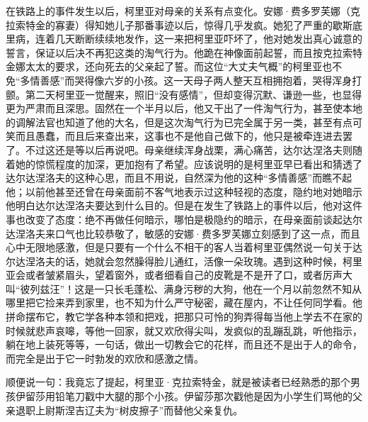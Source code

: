 \par 在铁路上的事件发生以后，柯里亚对母亲的关系有点变化。安娜·费多罗芙娜（克拉索特金的寡妻）得知她儿子那番事迹以后，惊得几乎发疯。她犯了严重的歇斯底里病，连着几天断断续续地发作，这一来把柯里亚吓坏了，他对她发出真心诚意的誓言，保证以后决不再犯这类的淘气行为。他跪在神像面前起誓，而且按克拉索特金娜太太的要求，还向死去的父亲起了誓。而这位“大丈夫气概”的柯里亚也不免“多情善感”而哭得像六岁的小孩。这一天母子两人整天互相拥抱着，哭得浑身打颤。第二天柯里亚一觉醒来，照旧“没有感情”，但却变得沉默、谦逊一些，也显得更为严肃而且深思。固然在一个半月以后，他又干出了一件淘气行为，甚至使本地的调解法官也知道了他的大名，但是这次淘气行为已完全属于另一类，甚至有点可笑而且愚蠢，而且后来查出来，这事也不是他自己做下的，他只是被牵连进去罢了。不过这还是等以后再说吧。母亲继续浑身战栗，满心痛苦，达尔达涅洛夫则随着她的惊慌程度的加深，更加抱有了希望。应该说明的是柯里亚早已看出和猜透了达尔达涅洛夫的这种心思，而且不用说，自然深为他的这种“多情善感”而瞧不起他；以前他甚至还曾在母亲面前不客气地表示过这种轻视的态度，隐约地对她暗示他明白达尔达涅洛夫要达到什么目的。但是在发生了铁路上的事件以后，他对这件事也改变了态度：绝不再做任何暗示，哪怕是极隐约的暗示，在母亲面前谈起达尔达涅洛夫来口气也比较恭敬了，敏感的安娜·费多罗芙娜立刻感到了这一点，而且心中无限地感激，但是只要有一个什么不相干的客人当着柯里亚偶然说一句关于达尔达涅洛夫的话，她就会忽然臊得脸儿通红，活像一朵玫瑰。遇到这种时候，柯里亚会或者皱紧眉头，望着窗外，或者细看自己的皮靴是不是开了口，或者厉声大叫“彼列兹汪”！这是一只长毛蓬松、满身污秽的大狗，他在一个月以前忽然不知从哪里把它捡来弄到家里，也不知为什么严守秘密，藏在屋内，不让任何同学看。他拼命摆布它，教它学各种本领和把戏，把那只可怜的狗弄得每当他上学去不在家的时候就悲声哀嗥，等他一回家，就又欢欣得尖叫，发疯似的乱蹦乱跳，听他指示，躺在地上装死等等，一句话，做出一切教会它的花样，而且还不是出于人的命令，而完全是出于它一时勃发的欢欣和感激之情。
\par 顺便说一句：我竟忘了提起，柯里亚·克拉索特金，就是被读者已经熟悉的那个男孩伊留莎用铅笔刀戳中大腿的那个小孩。伊留莎那次戳他是因为小学生们骂他的父亲退职上尉斯涅吉辽夫为“树皮擦子”而替他父亲复仇。
